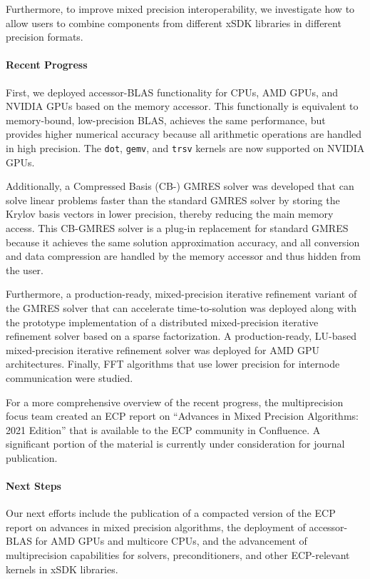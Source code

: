 Furthermore, to improve mixed precision interoperability, we investigate how to allow users to combine components from different xSDK libraries in different precision formats.


\paragraph{Recent Progress}
First, we deployed accessor-BLAS functionality for CPUs, AMD GPUs, and NVIDIA GPUs based on the memory accessor. This functionally is equivalent to memory-bound, low-precision BLAS, achieves the same performance, but provides higher numerical accuracy because all arithmetic operations are handled in high precision. The \texttt{dot}, \texttt{gemv}, and \texttt{trsv} kernels are now supported on NVIDIA GPUs.

Additionally, a Compressed Basis (CB-) GMRES solver was developed that can solve linear problems faster than the standard GMRES solver by storing the Krylov basis vectors in lower precision, thereby reducing the main memory access. This CB-GMRES solver is a plug-in replacement for standard GMRES because it achieves the same solution approximation accuracy, and all conversion and data compression are handled by the memory accessor and thus hidden from the user.

Furthermore, a production-ready, mixed-precision iterative refinement variant of the GMRES solver that can accelerate time-to-solution was deployed along with the prototype implementation of a distributed mixed-precision iterative refinement solver based on a sparse factorization.
A production-ready, LU-based mixed-precision iterative refinement solver was deployed for AMD GPU architectures.
Finally, FFT algorithms that use lower precision for internode communication were studied. 

For a more comprehensive overview of the recent progress, the multiprecision focus team created an ECP report on ``Advances in Mixed Precision Algorithms: 2021 Edition'' that is available to the ECP community in Confluence. A significant portion of the material is currently under consideration for journal publication.


\paragraph{Next Steps}

Our next efforts include the publication of a compacted version of the ECP report on advances in mixed precision algorithms, the deployment of accessor-BLAS for AMD GPUs and multicore CPUs,  and the advancement of multiprecision capabilities for solvers, preconditioners, and other ECP-relevant kernels in xSDK libraries.

